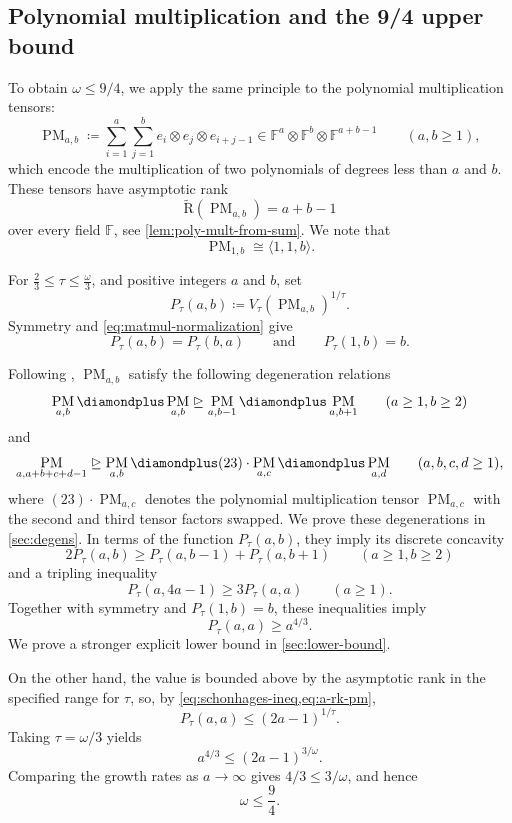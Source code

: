 \documentclass[11pt,letterpaper]{article}
\numberwithin{equation}{section}
\newcommand{\ark}{\widetilde{\mathrm{R}}}
\newcommand{\FF}{\mathbb{F}}
\DeclareMathOperator{\PM}{PM}
\begin{document}
\subsection{Polynomial multiplication and the 9/4 upper bound}

To obtain $\omega\leq 9/4$,
we apply the same principle to the polynomial multiplication tensors:
\[
\PM_{a,b} \coloneqq \sum_{i=1}^{a}\sum_{j=1}^{b} e_i \otimes e_j\otimes e_{i+j-1} \in \FF^{a}\otimes \FF^b\otimes \FF^{a+b-1} \qquad (a,b\geq1),
\] which encode the multiplication of two polynomials of degrees less than $a$ and $b$.
These tensors have asymptotic rank  \begin{equation}
\label{eq:a-rk-pm}
\ark(\PM_{a,b}) = a+b-1
\end{equation}
over every field $\FF$, see \cref{lem:poly-mult-from-sum}.
We note that \[
\PM_{1,b} \cong \langle 1,1,b\rangle.
\]

For $\frac{2}{3}\leq \tau \leq \frac{\omega}{3}$, and positive integers $a$ and $b$, set \[
P_\tau(a,b)\coloneqq V_\tau(\PM_{a,b})^{1/\tau}.
\] Symmetry and \cref{eq:matmul-normalization} give \[
P_\tau(a,b)=P_\tau(b,a)\qquad\text{and}\qquad P_\tau(1,b)=b.
\]


Following \cite{chatgpt-paper}, $\PM_{a,b}$ satisfy the following degeneration relations \[
\PM_{a,b}\diamondplus\PM_{a,b}\trianglerighteq \PM_{a,b-1}\diamondplus\PM_{a,b+1} \qquad (a\geq 1, b\geq 2)
\] and \[
\PM_{a,a+b+c+d-1} \trianglerighteq \PM_{a,b} \diamondplus (23)\cdot \PM_{a,c}\diamondplus \PM_{a,d} \qquad (a,b,c,d\geq 1),
\]
where $(23)\cdot \PM_{a,c}$ denotes the polynomial multiplication tensor $\PM_{a,c}$ with the second and third tensor factors swapped.
We prove these degenerations in \cref{sec:degens}.
In terms of the function $P_\tau(a,b)$, they imply its discrete concavity \[
2P_\tau(a,b)\geq P_\tau(a,b-1)+P_\tau(a,b+1)\qquad (a\geq 1, b\geq 2)
\] and a tripling inequality
\[
P_\tau(a,4a-1)\geq 3P_\tau(a,a) \qquad (a\geq 1).
\]
Together with symmetry and $P_\tau(1,b)=b$, these inequalities imply \[
P_{\tau}(a,a)\geq a^{4/3}.
\]
We prove a stronger explicit lower bound in \cref{sec:lower-bound}.

On the other hand, the value is bounded above by the asymptotic rank in the specified range for $\tau$, so, by \cref{eq:schonhages-ineq,eq:a-rk-pm}, \[
P_\tau(a,a)\leq (2a-1)^{1/\tau}.
\] Taking $\tau=\omega/3$ yields \[
a^{4/3} \leq (2a-1)^{3/\omega}.
\] Comparing the growth rates as $a\rightarrow\infty$ gives $4/3\leq 3/\omega$, and hence \[
\omega \leq \frac{9}{4}.
\]
\end{document}
